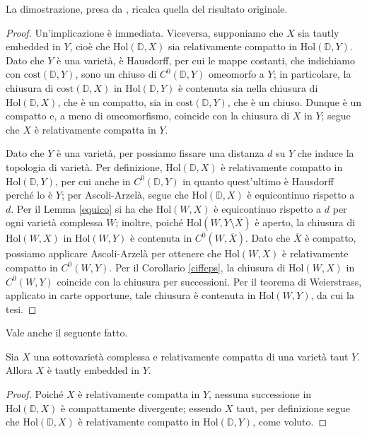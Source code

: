 La dimostrazione, presa da \cite[Proposition 2.1.4, point (i)]{A2}, ricalca quella del risultato originale.

\begin{proof}
    Un'implicazione è immediata. Viceversa, supponiamo che $X$ sia tautly embedded in $Y$, cioè che $\text{Hol}(\mathbb{D},X)$ sia relativamente compatto in $\text{Hol}(\mathbb{D},Y)$. Dato che $Y$ è una varietà, è Hausdorff, per cui le mappe costanti, che indichiamo con $\text{cost}(\mathbb{D},Y)$, sono un chiuso di $C^0(\mathbb{D},Y)$ omeomorfo a $Y$; in particolare, la chiusura di $\text{cost}(\mathbb{D},X)$ in $\text{Hol}(\mathbb{D},Y)$ è contenuta sia nella chiusura di $\text{Hol}(\mathbb{D},X)$, che è un compatto, sia in $\text{cost}(\mathbb{D},Y)$, che è un chiuso. Dunque è un compatto e, a meno di omeomorfismo, coincide con la chiusura di $X$ in $Y$; segue che $X$ è relativamente compatta in $Y$.
    
    Dato che $Y$ è una varietà, per \cite[4.16]{Ke} possiamo fissare una distanza $d$ su $Y$ che induce la topologia di varietà. Per definizione, $\text{Hol}(\mathbb{D},X)$ è relativamente compatto in $\text{Hol}(\mathbb{D},Y)$, per cui anche in $C^0(\mathbb{D},Y)$ in quanto quest'ultimo è Hausdorff perché lo è $Y$; per Ascoli-Arzelà, segue che $\text{Hol}(\mathbb{D},X)$ è equicontinuo rispetto a $d$. Per il Lemma \ref{equico} si ha che $\text{Hol}(W,X)$ è equicontinuo rispetto a $d$ per ogni varietà complessa $W$; inoltre, poiché $\text{Hol}(W,Y\setminus\overline{X})$ è aperto, la chiusura di $\text{Hol}(W,X)$ in $\text{Hol}(W,Y)$ è contenuta in $C^0(W,\overline{X})$. Dato che $\overline{X}$ è compatto, possiamo applicare Ascoli-Arzelà per ottenere che $\text{Hol}(W,X)$ è relativamente compatto in $C^0(W,Y)$. Per il Corollario \ref{ciffcps}, la chiusura di $\text{Hol}(W,X)$ in $C^0(W,Y)$ coincide con la chiusura per successioni. Per il teorema di Weierstrass, applicato in carte opportune, tale chiusura è contenuta in $\text{Hol}(W,Y)$, da cui la tesi.
\end{proof}

Vale anche il seguente fatto.

\begin{prop} \label{letnom}
    Sia $X$ una sottovarietà complessa e relativamente compatta di una varietà taut $Y$. Allora $X$ è tautly embedded in $Y$.
\end{prop}

\begin{proof}
    Poiché $X$ è relativamente compatta in $Y$, nessuna successione in $\text{Hol}(\mathbb{D},X)$ è compattamente divergente; essendo $X$ taut, per definizione segue che $\text{Hol}(\mathbb{D},X)$ è relativamente compatto in $\text{Hol}(\mathbb{D},Y)$, come voluto.
\end{proof}

